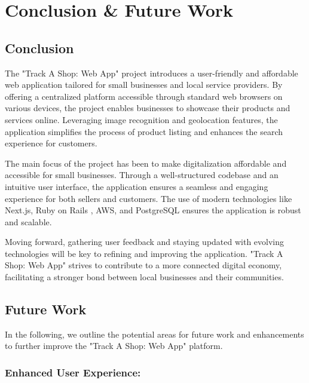
\chapter{Conclusion \& Future Work} %

\label{Chapter5} %



\section{Conclusion}
The "Track A Shop: Web App" project introduces a user-friendly and affordable web application tailored for small businesses and local service providers. By offering a centralized platform accessible through standard web browsers on various devices, the project enables businesses to showcase their products and services online. Leveraging image recognition and geolocation features, the application simplifies the process of product listing and enhances the search experience for customers.

The main focus of the project has been to make digitalization affordable and accessible for small businesses. Through a well-structured codebase and an intuitive user interface, the application ensures a seamless and engaging experience for both sellers and customers. The use of modern technologies like Next.js, Ruby on Rails \citep{therails7way}, AWS, and PostgreSQL ensures the application is robust and scalable.

Moving forward, gathering user feedback and staying updated with evolving technologies will be key to refining and improving the application. "Track A Shop: Web App" strives to contribute to a more connected digital economy, facilitating a stronger bond between local businesses and their communities.


\section{Future Work}
In the following, we outline the potential areas for future work and enhancements to further improve the "Track A Shop: Web App" platform.

\subsection{Enhanced User Experience:}

